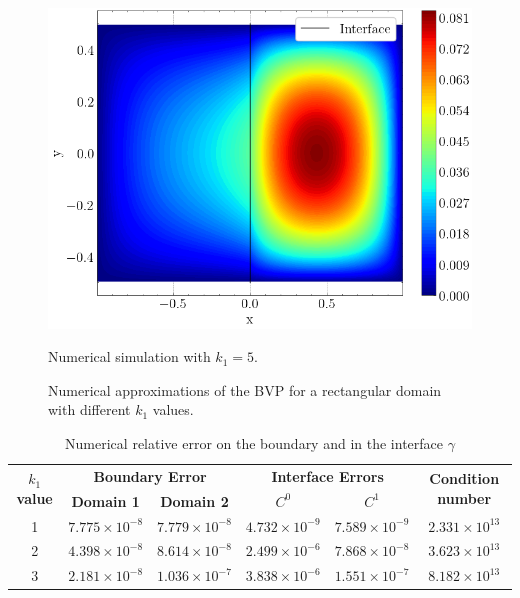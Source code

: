 \begin{figure}[!htb]
    \vspace{0.5cm} %
    
    \begin{minipage}{.6\textwidth}
      \centering
      \includegraphics[width=0.9\linewidth]{Images/Transmission/Rectangle_contour_600_150_k1_5.png}
      \caption{Numerical simulation with  \(k_1=5\).}
      \label{transmission_rectangle_plot_k1_5}
    \end{minipage}
    
    \caption*{Numerical approximations of the \ac{BVP} for a rectangular domain with different \(k_1\) values.}
    \label{transmission_rectangle_plots}
\end{figure}

\begin{table}[htbp]
    \centering
    \begin{tabular}{cccccc}
      \toprule
      \multirow{2}{*}{\textbf{\(k_1\) value}} & \multicolumn{2}{c}{\textbf{Boundary Error}} & \multicolumn{2}{c}{\textbf{Interface Errors}} & \multirow{2}{*}{\textbf{Condition number}} \\
      \cmidrule(lr){2-3} \cmidrule(lr){4-5}
      & \textbf{Domain 1} & \textbf{Domain 2} & \textbf{\(C^0\)} & \textbf{\(C^1\)} & \\
      \midrule
      1 & $7.775\times10^{-8}$ & $7.779\times10^{-8}$ & $4.732\times10^{-9}$ & $7.589\times10^{-9}$ & $2.331\times 10^{13}$\\
      2 & $4.398\times10^{-8}$ & $8.614\times10^{-8}$ & $2.499\times10^{-6}$ & $7.868\times10^{-8}$ & $3.623\times 10^{13}$\\
      3 & $2.181\times10^{-8}$ & $1.036\times10^{-7}$ & $3.838\times10^{-6}$ & $1.551\times10^{-7}$ & $8.182\times 10^{13}$\\
      \bottomrule
    \end{tabular}
    \caption{Numerical relative error on the boundary and in the interface \(\gamma\)}
    \label{tab:transmission_results_rectangle}
\end{table}

